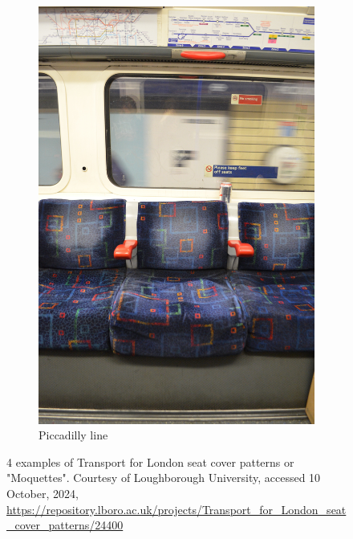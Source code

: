 \begin{figure}[H]
\begin{subfigure}[b]{0.22\textwidth}
        \includegraphics[width=\textwidth]{guidance/images/rathbone2017piccadilly.jpg}
        \caption{Piccadilly line \parencite{rathbone2017piccadilly}}
        \label{fig:rathbone2017piccadilly}
    \end{subfigure}
    \caption{4 examples of Transport for London seat cover patterns or "Moquettes". Courtesy of Loughborough University, accessed 10 October, 2024, \url{https://repository.lboro.ac.uk/projects/Transport_for_London_seat_cover_patterns/24400}}
    \label{fig:rathbone2017}
\end{figure}